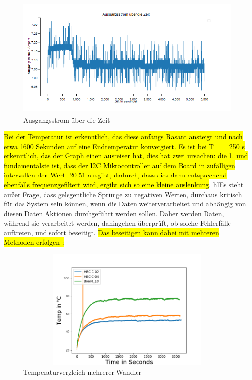 \begin{figure}
    \centering
    \includegraphics[height= 6cm, width = 12cm]{Pictures/B1_P3_IOUT_Rauschen.png}
    \caption{Ausgangsstrom über die Zeit}
\end{figure}

\begin{flushleft}
\hl{Bei der Temperatur ist erkenntlich, das diese anfangs Rasant ansteigt und nach etwa 1600 Sekunden auf eine Endtemperatur konvergiert. Es ist bei T = ~ 250 s erkenntlich, das der Graph einen ausreiser hat, dies hat zwei ursachen: die 1. und fundamentalste ist, dass der I2C Mikrocontroller auf dem Board in zufälligen intervallen den Wert -20.51 ausgibt, dadurch, dass dies dann entsprechend ebenfalls frequenzgefiltert wird, ergibt sich so eine kleine auslenkung}. hl{Es steht außer Frage, dass gelegentliche Sprünge zu negativen Werten, durchaus kritisch für das System sein können, wenn die Daten weiterverarbeitet und abhängig von diesen Daten Aktionen durchgeführt werden sollen. } Daher werden Daten, während sie verarbeitet werden, dahingehen überprüft, ob solche Fehlerfälle auftreten, und sofort beseitigt. \hl{Das beseitigen kann dabei mit mehreren Methoden erfolgen : }
\end{flushleft}


\begin{figure}
    \centering
    \includegraphics[height= 6cm, width = 12cm]{Pictures/3_Boards_Temp.png}
    \caption{Temperaturvergleich mehrerer Wandler}
\end{figure}


